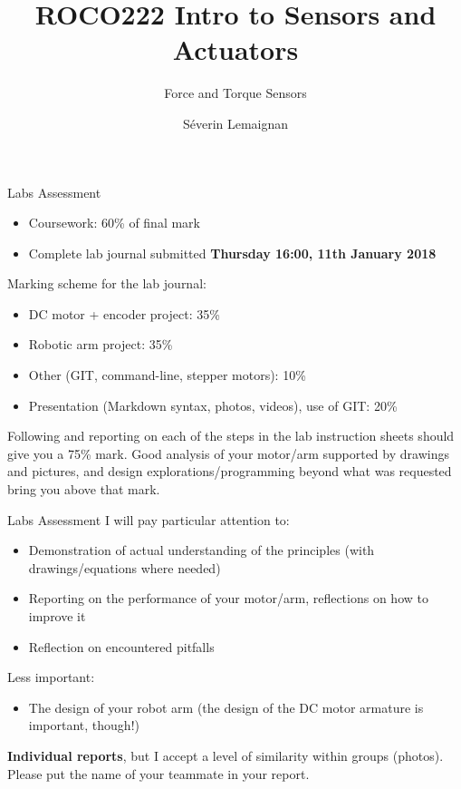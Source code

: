 \documentclass[compress]{beamer}
\title{ROCO222 \newline Intro to Sensors and Actuators}
\subtitle{Force and Torque Sensors}
\date{}
\author{Séverin Lemaignan}
\institute{Centre for Neural Systems and Robotics\\{\bf Plymouth University}}
\makeatletter
\def\beamer@writeslidentry@miniframesoff{%
  \expandafter\beamer@ifempty\expandafter{\beamer@framestartpage}{}%
  {%
    \clearpage\beamer@notesactions%
  }
}
\newcommand*{\miniframesoff}{\let\beamer@writeslidentry=\beamer@writeslidentry@miniframesoff}
\makeatother
\begin{document}

\maketitle

\miniframesoff

\begin{frame}{Labs Assessment}

    \begin{itemize}
        \item Coursework: 60\% of final mark
        \item Complete lab journal submitted \textbf{Thursday 16:00, 11th January 2018}
    \end{itemize}

    \pause

    Marking scheme for the lab journal:

    \begin{itemize}
        \item DC motor + encoder project: 35\%
        \item Robotic arm project: 35\%
        \item Other (GIT, command-line, stepper motors): 10\%
        \item Presentation (Markdown syntax, photos, videos), use of GIT: 20\%
    \end{itemize}

    Following and reporting on each of the steps in the lab instruction sheets
    should give you a 75\% mark. Good analysis of your motor/arm supported by
    drawings and pictures, and design explorations/programming beyond what was
    requested bring you above that mark.

\end{frame}

\begin{frame}{Labs Assessment}
    I will pay particular attention to:
    \begin{itemize}
        \item Demonstration of actual understanding of the principles
            (with drawings/equations where needed)
        \item Reporting on the performance of your motor/arm, reflections on how
            to improve it
        \item Reflection on encountered pitfalls
    \end{itemize}

    Less important:
    \begin{itemize}
        \item The design of your robot arm (the design of the DC motor armature
            is important, though!)
    \end{itemize}

    \textbf{Individual reports}, but I accept a level of similarity within
    groups (\eg photos). Please put the name of your teammate in your report.
\end{frame}
\end{document}
